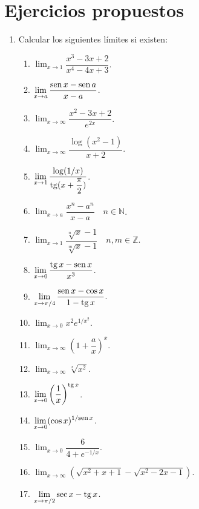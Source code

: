 \section{Ejercicios propuestos}
\begin{enumerate}[leftmargin=*]
\item  Calcular los siguientes límites si existen:
      \begin{multicols}{2}
      \begin{enumerate}
      \item  $\displaystyle \lim_{x\rightarrow 1}\dfrac{x^3-3x+2}{x^4-4x+3}$.
      \item  $\displaystyle \lim_{x\rightarrow a}\dfrac{\operatorname{sen} x-\operatorname{sen} a}{x-a}$.
      \item $\displaystyle \lim_{x\rightarrow\infty}\dfrac{x^2-3x+2}{e^{2x}}$.
      \item $\displaystyle \lim_{x\rightarrow\infty}\dfrac{\log(x^2-1)}{x+2}$.
      \item $\displaystyle \lim_{x\rightarrow 1}\dfrac{\log(1/x)}{\operatorname{tg}(x+\dfrac{\pi}{2})}$.
      \item $\displaystyle \lim_{x\rightarrow a}\dfrac{x^n-a^n}{x-a}\quad n\in \mathbb{N}$.
      \item $ \displaystyle \lim_{x\rightarrow 1}\dfrac{\sqrt[n]{x}-1}{\sqrt[m]{x}-1}\quad n,m \in \mathbb{Z}$.
      \item $\displaystyle \lim_{x\rightarrow 0}\dfrac{\operatorname{tg} x-\operatorname{sen} x}{x^3}$.
      \item $\displaystyle \lim_{x\rightarrow \pi/4}\dfrac{\operatorname{sen} x-\cos x}{1-\operatorname{tg} x}$.
      \item $\displaystyle \lim_{x\rightarrow 0}x^2e^{1/x^2}$.
      \item $\displaystyle \lim_{x\rightarrow \infty}\left(1+\dfrac{a}{x}\right)^x$.
      \item $\displaystyle \lim_{x\rightarrow \infty} \sqrt[x]{x^2}$.
      \item $\displaystyle \lim_{x\rightarrow 0}\left(\dfrac{1}{x}\right)^{\operatorname{tg} x}$.
      \item $\displaystyle \lim_{x\rightarrow 0}(\cos x)^{1/\mbox{\footnotesize sen}\, x}$.
      \item $\displaystyle \lim_{x\rightarrow 0}\dfrac{6}{4+e^{-1/x}}$.
      \item $\displaystyle \lim_{x\rightarrow \infty}\left(\sqrt{x^2+x+1}-\sqrt{x^2-2x-1}\right)$.
      \item $\displaystyle \lim_{x\rightarrow \pi/2}\sec x-\operatorname{tg} x$.
      \end{enumerate}
      \end{multicols}


\end{enumerate}
